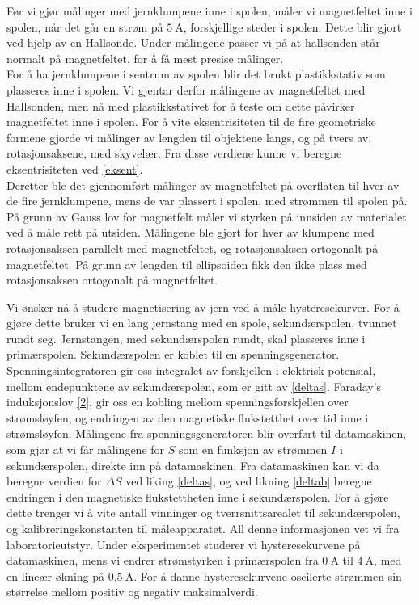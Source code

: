 \documentclass[%
 reprint,
 amsmath,amssymb,
 aps,
 norsk,
]{revtex4-1}
\begin{document}
Før vi gjør målinger med jernklumpene inne i spolen, måler vi magnetfeltet inne i spolen, når det går en strøm på $\SI{5}{\ampere}$, forskjellige steder i spolen. Dette blir gjort ved hjelp av en Hallsonde. Under målingene passer vi på at hallsonden står normalt på magnetfeltet, for å få mest presise målinger.\\For å ha jernklumpene i sentrum av spolen blir det brukt plastikkstativ som plasseres inne i spolen. Vi gjentar derfor målingene av magnetfeltet med Hallsonden, men nå med plastikkstativet for å teste om dette påvirker magnetfeltet inne i spolen. For å vite eksentrisiteten til de fire geometriske formene gjorde vi målinger av lengden til objektene langs, og på tvers av, rotasjonsaksene, med skyvelær. Fra disse verdiene kunne vi beregne eksentrisiteten ved \eqref{eksent}.\\
Deretter ble det gjennomført målinger av magnetfeltet på overflaten til hver av de fire jernklumpene, mens de var plassert i spolen, med strømmen til spolen på. På grunn av Gauss lov for magnetfelt måler vi styrken på innsiden av materialet ved å måle rett på utsiden. Målingene ble gjort for hver av klumpene med rotasjonsaksen parallelt med magnetfeltet, og rotasjonsaksen ortogonalt på magnetfeltet. På grunn av lengden til ellipsoiden fikk den ikke plass med rotasjonsaksen ortogonalt på magnetfeltet.\par
Vi ønsker nå å studere magnetisering av jern ved å måle hysteresekurver. For å gjøre dette bruker vi en lang jernstang med en spole, sekundærspolen, tvunnet rundt seg. Jernstangen, med sekundærspolen rundt, skal plasseres inne i primærspolen. Sekundærspolen er koblet til en spenningsgenerator. Spenningsintegratoren gir oss integralet av forskjellen i elektrisk potensial, mellom endepunktene av sekundærspolen, som er gitt av \eqref{deltas}. Faraday's induksjonslov \eqref{2}, gir oss en kobling mellom spenningsforskjellen over strømsløyfen, og endringen av den magnetiske flukstetthet over tid inne i strømsløyfen. Målingene fra spenningsgeneratoren blir overført til datamaskinen, som gjør at vi får målingene for $S$ som en funksjon av strømmen $I$ i sekundærspolen, direkte inn på datamaskinen. Fra datamaskinen kan vi da beregne verdien for $\Delta S$ ved liking \eqref{deltas}, og ved likning \eqref{deltab} beregne endringen i den magnetiske flukstettheten inne i sekundærspolen. For å gjøre dette trenger vi å vite antall vinninger og tverrsnittsarealet til sekundærspolen, og kalibreringskonstanten til måleapparatet. All denne informasjonen vet vi fra laboratorieutstyr. Under eksperimentet studerer vi hysteresekurvene på datamaskinen, mens vi endrer strømstyrken i primærspolen fra $\SI{0}{\ampere}$ til $\SI{4}{\ampere}$, med en lineær økning på $\SI{0.5}{\ampere}$. For å danne hysteresekurvene oscilerte strømmen sin størrelse mellom positiv og negativ maksimalverdi.
\end{document}
